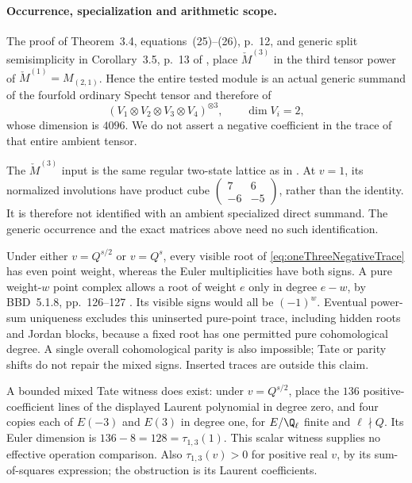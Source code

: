 \paragraph{Occurrence, specialization and arithmetic scope.}
The proof of Theorem~3.4, equations~(25)--(26),
p.~12, and generic split semisimplicity in
Corollary~3.5, p.~13 of
\cite{BlasiakChebyshev}, place
\(\check M^{(3)}\) in the third tensor power
of \(\check M^{(1)}=M_{(2,1)}\).
Hence the entire tested module is an actual
generic summand of the fourfold ordinary
Specht tensor and therefore of
\[
 (V_1\otimes V_2\otimes V_3\otimes V_4)^{\otimes3},
 \qquad\dim V_i=2,
\]
whose dimension is \(4096\).
We do not assert a negative coefficient in
the trace of that entire ambient tensor.

The \(\check M^{(3)}\) input is the same regular
two-state lattice as in .
At \(v=1\), its normalized involutions have
product cube
\(\left(\begin{smallmatrix}7&6\\-6&-5\end{smallmatrix}\right)\),
rather than the identity.
It is therefore not identified with an
ambient specialized direct summand.
The generic occurrence and the exact
matrices above need no such identification.

Under either \(v=Q^{s/2}\) or \(v=Q^s\),
every visible root of
\eqref{eq:oneThreeNegativeTrace} has even
point weight, whereas the Euler multiplicities
have both signs. A pure weight-\(w\) point
complex allows a root of weight \(e\) only
in degree \(e-w\), by BBD~5.1.8,
pp.~126--127 \cite{BBD}.
Its visible signs would all be \((-1)^w\).
Eventual power-sum uniqueness excludes this
uninserted pure-point trace, including hidden
roots and Jordan blocks, because a fixed root
has one permitted pure cohomological degree.
A single overall cohomological parity is also
impossible; Tate or parity shifts do not repair
the mixed signs. Inserted traces are outside
this claim.

A bounded mixed Tate witness does exist:
under \(v=Q^{s/2}\), place the \(136\)
positive-coefficient lines of the displayed
Laurent polynomial in degree zero, and four
copies each of \(E(-3)\) and \(E(3)\) in
degree one, for \(E/\Q_\ell\) finite and
\(\ell\nmid Q\).
Its Euler dimension is \(136-8=128=\tau_{1,3}(1)\).
This scalar witness supplies no effective
operation comparison.
Also \(\tau_{1,3}(v)>0\) for positive real
\(v\), by its sum-of-squares expression;
the obstruction is its Laurent coefficients.

